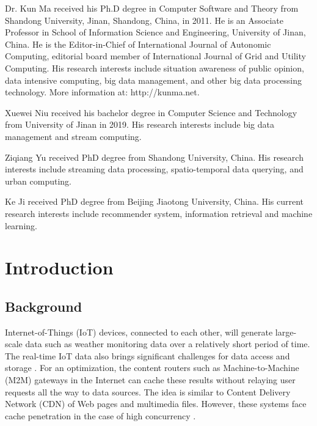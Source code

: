 \documentclass{singlecol-new}
\theoremstyle{TH}{
\newtheorem{lemma}{Lemma}
\newtheorem{theorem}[lemma]{Theorem}
\newtheorem{corrolary}[lemma]{Corrolary}
\newtheorem{conjecture}[lemma]{Conjecture}
\newtheorem{proposition}[lemma]{Proposition}
\newtheorem{claim}[lemma]{Claim}
\newtheorem{stheorem}[lemma]{Wrong Theorem}
}
\theoremstyle{THrm}{
\newtheorem{definition}{Definition}[section]
\newtheorem{question}{Question}[section]
\newtheorem{remark}{Remark}
\newtheorem{scheme}{Scheme}
}
\theoremstyle{THhit}{
\newtheorem{case}{Case}[section]
}
\begin{document}


\begin{bio}
Dr. Kun Ma received his Ph.D degree in Computer Software and Theory from Shandong University, Jinan, Shandong, China, in 2011. He is an Associate Professor in School of Information Science and Engineering, University of Jinan, China. He is the Editor-in-Chief of International Journal of Autonomic Computing, editorial board member of International Journal of Grid and Utility Computing. His research interests include situation awareness of public opinion, data intensive computing, big data management, and other big data processing technology. More information at: http://kunma.net.

\noindent Xuewei Niu received his bachelor degree in Computer Science and Technology from University of Jinan in 2019. His research interests include big data management and stream computing.

\noindent Ziqiang Yu received PhD degree from Shandong University, China. His research interests include streaming data processing, spatio-temporal data querying, and urban computing.

\noindent Ke Ji received PhD degree from Beijing Jiaotong University, China. His current research interests include recommender system, information retrieval and machine learning.

\end{bio}

\maketitle


\section{Introduction}
\label{Introduction}

\subsection{Background}
Internet-of-Things (IoT) \cite{zanella2014internet} devices, connected to each other, will generate large-scale data such as weather monitoring data over a relatively short period of time. The real-time IoT data also brings significant challenges for data access and storage \cite{kaisler2013big}. For an optimization, the content routers such as Machine-to-Machine (M2M) gateways in the Internet can cache these results without relaying user requests all the way to data sources. The idea is similar to Content Delivery Network (CDN) of Web pages and multimedia files. However, these systems face cache penetration in the case of high concurrency \cite{nishtala2013scaling}.
\end{document}
